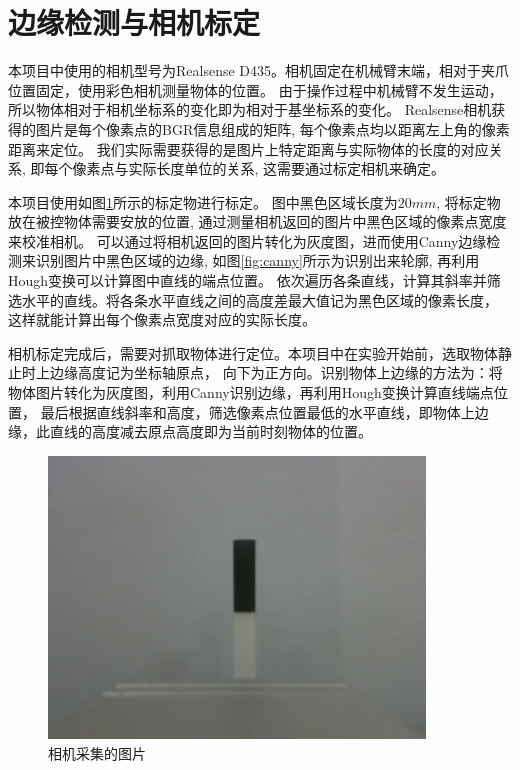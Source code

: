 \section{边缘检测与相机标定}
本项目中使用的相机型号为Realsense D435。相机固定在机械臂末端，相对于夹爪位置固定，使用彩色相机测量物体的位置。
由于操作过程中机械臂不发生运动，
所以物体相对于相机坐标系的变化即为相对于基坐标系的变化。
Realsense相机获得的图片是每个像素点的BGR信息组成的矩阵,
每个像素点均以距离左上角的像素距离来定位。
我们实际需要获得的是图片上特定距离与实际物体的长度的对应关系,
即每个像素点与实际长度单位的关系, 这需要通过标定相机来确定。

本项目使用如图\ref{fig:src}所示的标定物进行标定。
图中黑色区域长度为$20mm$, 将标定物放在被控物体需要安放的位置,
通过测量相机返回的图片中黑色区域的像素点宽度来校准相机。
可以通过将相机返回的图片转化为灰度图，进而使用Canny边缘检测来识别图片中黑色区域的边缘,
如图\ref{fig:canny}所示为识别出来轮廓, 再利用Hough变换可以计算图中直线的端点位置。
依次遍历各条直线，计算其斜率并筛选水平的直线。将各条水平直线之间的高度差最大值记为黑色区域的像素长度，
这样就能计算出每个像素点宽度对应的实际长度。


相机标定完成后，需要对抓取物体进行定位。本项目中在实验开始前，选取物体静止时上边缘高度记为坐标轴原点，
向下为正方向。识别物体上边缘的方法为：将物体图片转化为灰度图，利用Canny识别边缘，再利用Hough变换计算直线端点位置，
最后根据直线斜率和高度，筛选像素点位置最低的水平直线，即物体上边缘，此直线的高度减去原点高度即为当前时刻物体的位置。

\begin{figure}[!ht]
  \centering
  \includegraphics[width=10cm]{chapter04/pic/src}
  \caption{\label{fig:src}
    相机采集的图片}
  \vspace{-0.3cm}
\end{figure}

